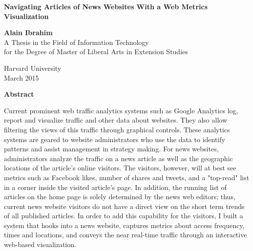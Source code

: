 \documentclass[12pt]{article}
\begin{document}


\thispagestyle{empty}
    \begin{center}
        
        \begin{doublespace}        
        \textbf{\Large Navigating Articles of News Websites With a Web Metrics Visualization}
        \vfill

        \vspace{2in}
        \textbf{\Large Alain Ibrahim} \\
		\vspace{2in}
        A Thesis in the Field of Information Technology \\
        for the Degree of Master of Liberal Arts in Extension Studies \\

        \vspace{.5in} 

        
        Harvard University \\
        \vspace {.4in}
        March 2015        

		\end{doublespace}        
        
        \vfill
         
    \end{center}

\vfill
\newpage

\newpage\null\thispagestyle{empty}\newpage

\begin{center}
\Large\textbf{Abstract}
\end{center}


\thispagestyle{empty}
Current prominent web traffic analytics systems such as Google Analytics log, report and visualize traffic and other data about websites. They also allow filtering the views of this traffic through graphical controls. These analytics systems are geared to website administrators who use the data to identify patterns and assist management in strategy making. For news websites, administrators analyze the traffic on a news article as well as the geographic locations of the article's online visitors. The visitors, however, will at best see metrics such as Facebook likes, number of shares and tweets, and a "top-read" list in a corner inside the visited article's page. In addition, the running list of articles on the home page is solely determined by the news web editors; thus, current news website visitors do not have a direct view on the short term trends of all published articles. In order to add this capability for the visitors, I built a system that hooks into a news website, captures metrics about access frequency, times and locations, and conveys the near real-time traffic through an interactive web-based visualization.
\end{document}
